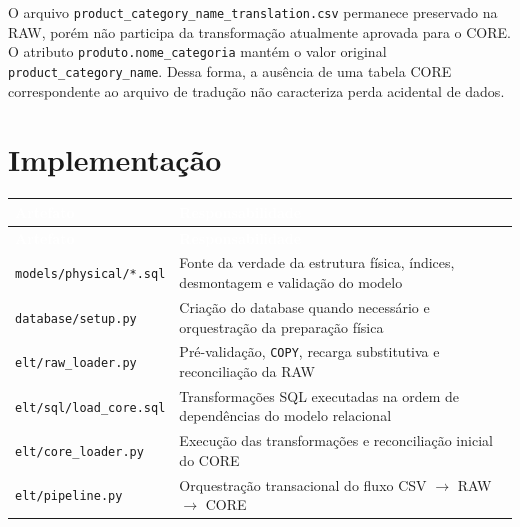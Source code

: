 \documentclass[12pt,a4paper]{article}
\begin{document}
	O arquivo \texttt{product\_category\_name\_translation.csv} permanece preservado
	na RAW, porém não participa da transformação atualmente aprovada para o CORE.
	O atributo \texttt{produto.nome\_categoria} mantém o valor original
	\texttt{product\_category\_name}. Dessa forma, a ausência de uma tabela CORE
	correspondente ao arquivo de tradução não caracteriza perda acidental de dados.
	
	\section{Implementação}
	
	{\small
		\renewcommand{\arraystretch}{1.2}
		\begin{longtable}{
				|>{\raggedright\arraybackslash}p{5.2cm}|
				>{\raggedright\arraybackslash}p{9.4cm}|
			}
			\hline
			\rowcolor{AzulCorporativo}
			\textcolor{white}{\textbf{Artefato}} &
			\textcolor{white}{\textbf{Responsabilidade}} \\\hline
			\endfirsthead
			
			\hline
			\rowcolor{AzulCorporativo}
			\textcolor{white}{\textbf{Artefato}} &
			\textcolor{white}{\textbf{Responsabilidade}} \\\hline
			\endhead
			
			\texttt{models/physical/*.sql} &
			Fonte da verdade da estrutura física, índices, desmontagem e validação
			do modelo \\\hline
			
			\texttt{database/setup.py} &
			Criação do database quando necessário e orquestração da preparação
			física \\\hline
			
			\texttt{elt/raw\_loader.py} &
			Pré-validação, \texttt{COPY}, recarga substitutiva e reconciliação da
			RAW \\\hline
			
			\texttt{elt/sql/load\_core.sql} &
			Transformações SQL executadas na ordem de dependências do modelo
			relacional \\\hline
			
			\texttt{elt/core\_loader.py} &
			Execução das transformações e reconciliação inicial do CORE \\\hline
			
			\texttt{elt/pipeline.py} &
			Orquestração transacional do fluxo CSV $\rightarrow$ RAW
			$\rightarrow$ CORE \\\hline
			

\end{longtable}}
\end{document}
